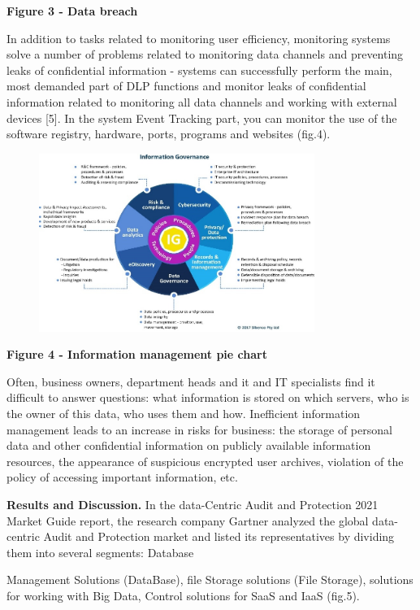 {\bfseries Figure 3 - Data breach}

In addition to tasks related to monitoring user efficiency, monitoring
systems solve a number of problems related to monitoring data channels
and preventing leaks of confidential information - systems can
successfully perform the main, most demanded part of DLP functions and
monitor leaks of confidential information related to monitoring all data
channels and working with external devices {[}5{]}. In the system Event
Tracking part, you can monitor the use of the software registry,
hardware, ports, programs and websites (fig.4).

\begin{figure}[H]
	\centering
	\includegraphics[width=0.8\textwidth]{assets/66}
	\caption*{}
\end{figure}

{\bfseries Figure 4 - Information management pie chart}

Often, business owners, department heads and it and IT specialists find
it difficult to answer questions: what information is stored on which
servers, who is the owner of this data, who uses them and how.
Inefficient information management leads to an increase in risks for
business: the storage of personal data and other confidential
information on publicly available information resources, the appearance
of suspicious encrypted user archives, violation of the policy of
accessing important information, etc.

{\bfseries Results and Discussion.} In the data-Centric Audit and
Protection 2021 Market Guide report, the research company Gartner
analyzed the global data-centric Audit and Protection market and listed
its representatives by dividing them into several segments: Database

Management Solutions (DataBase), file Storage solutions (File Storage),
solutions for working with Big Data, Control solutions for SaaS and IaaS
(fig.5).

